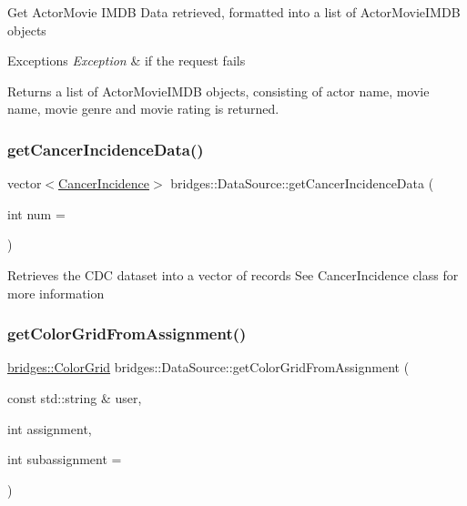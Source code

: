 Get Actor\+Movie I\+M\+DB Data retrieved, formatted into a list of Actor\+Movie\+I\+M\+DB objects


\begin{DoxyExceptions}{Exceptions}
{\em Exception} & if the request fails\\
\hline
\end{DoxyExceptions}
\begin{DoxyReturn}{Returns}
a list of Actor\+Movie\+I\+M\+DB objects, consisting of actor name, movie name, movie genre and movie rating is returned. 
\end{DoxyReturn}
\mbox{\label{classbridges_1_1_data_source_a52d8161e7c093ab3615acea7085f6689}} 
\subsubsection{\texorpdfstring{get\+Cancer\+Incidence\+Data()}{getCancerIncidenceData()}}
{\footnotesize\ttfamily vector$<$\hyperlink{classbridges_1_1dataset_1_1_cancer_incidence}{Cancer\+Incidence}$>$ bridges\+::\+Data\+Source\+::get\+Cancer\+Incidence\+Data (\begin{DoxyParamCaption}\item[{int}]{num = {} }\end{DoxyParamCaption})\hspace{0.3cm}{\ttfamily [inline]}}

Retrieves the C\+DC dataset into a vector of records See Cancer\+Incidence class for more information \mbox{\label{classbridges_1_1_data_source_aa65136879011e1ec237380ef8587fea2}} 
\subsubsection{\texorpdfstring{get\+Color\+Grid\+From\+Assignment()}{getColorGridFromAssignment()}}
{\footnotesize\ttfamily \hyperlink{classbridges_1_1datastructure_1_1_color_grid}{bridges\+::\+Color\+Grid} bridges\+::\+Data\+Source\+::get\+Color\+Grid\+From\+Assignment (\begin{DoxyParamCaption}\item[{const std\+::string \&}]{user,  }\item[{int}]{assignment,  }\item[{int}]{subassignment = {} }\end{DoxyParamCaption})\hspace{0.3cm}{\ttfamily [inline]}}

